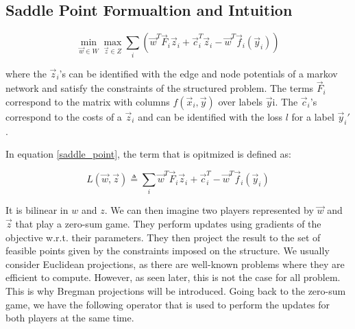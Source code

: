 \subsection{Saddle Point Formualtion and Intuition}
\begin{equation}
  \min_{\vec w \in {W}} \max_{\vec z \in {Z}} \sum_i \left( \vec
w^T \vec F_i \vec z_i + \vec c_i^T \vec z_i - \vec w^T \vec f_i(\vec y_i)
\right)
  \label{saddle_point}
\end{equation}

where the $\vec z_i$'s can be identified with the edge and node potentials of a
markov network and satisfy the constraints of the structured problem. The terms
$\vec F_i$ correspond to the matrix with columns $f(\vec x_i, \vec y)$ over labels $\vec y$i.  
The $\vec c_i$'s correspond to the costs of a $\vec z_i$ and can be
identified with the loss $l$ for a label $\vec y_i'$.

In equation \ref{saddle_point}, the term that is opitmized is defined
as:

\begin{equation}
  {L}(\vec w,\vec z) \triangleq \sum_i \vec w^T \vec F_i \vec z_i + \vec
c_i^T - \vec w^T \vec f_i(\vec y_i)
  \label{saddle_obj}
\end{equation}

It is bilinear in $w$ and $z$. We can then imagine two players represented by
$\vec w$ and $\vec z$ that play a zero-sum game. They perform updates using gradients of
the objective w.r.t. their parameters. They then project the result to the set
of feasible points given by the constraints imposed on the structure. We usually
consider Euclidean projections, as there are well-known problems where they are
efficient to compute. However, as seen later, this is not the case for all
problem. This is why Bregman projections will be introduced. Going back to the
zero-sum game, we have the following operator that is used to perform the
updates for both players at the same time.


